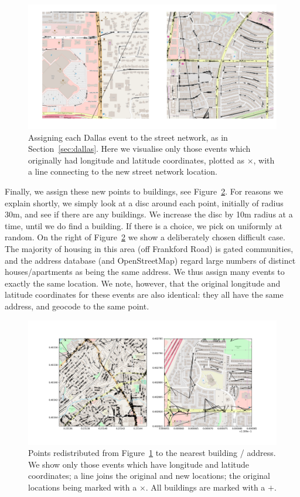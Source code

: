 \documentclass[twoside,a4paper,twocolumn,10pt]{article}
\theoremstyle{plain}
\theoremstyle{definition}
\begin{document}
\begin{figure}
  \includegraphics[width=\textwidth]{dallas_coords_to_streets.png}
  \caption{Assigning each Dallas event to the street network, as in Section~\ref{sec:dallas}.
Here we visualise only those events which originally had longitude and latitude coordinates,
plotted as $\times$, with a line connecting to the new street network location.}
  \label{fig:dallas_to_streets}
\end{figure}

Finally, we assign these new points to buildings, see Figure~\ref{fig:dallas_to_buildings}.
For reasons we explain shortly, we simply look at a disc around each point, initially of
radius 30m, and see if there are any buildings.  We increase the disc by 10m radius at a time,
until we do find a building.  If there is a choice, we pick on uniformly at random.
On the right of Figure~\ref{fig:dallas_to_buildings} we show a deliberately chosen difficult
case.  The majority of housing in this area (off Frankford Road) is gated communities, and the
address database (and OpenStreetMap) regard large numbers of distinct houses/apartments as being
the same address.  We thus assign many events to exactly the same location.  We note, however,
that the original longitude and latitude coordinates for these events are also identical:
they all have the same address, and geocode to the same point.

\begin{figure}
  \includegraphics[width=\textwidth]{dallas_redist_to_buildings.png}
  \caption{Points redistributed from Figure~\ref{fig:dallas_to_streets} to the nearest
building / address.  We show only those events which have longitude and latitude coordinates;
a line joins the original and new locations; the original locations being marked with a
$\times$.  All buildings are marked with a $+$.}
  \label{fig:dallas_to_buildings}
\end{figure}
\end{document}
